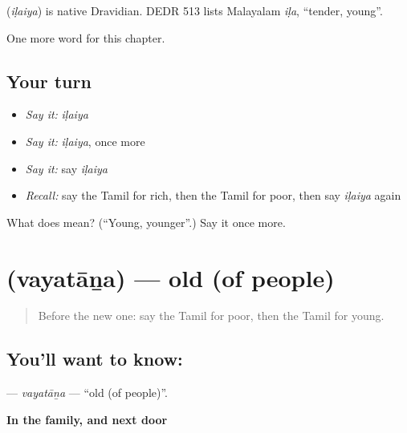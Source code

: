 \begin{cousinweb}
\textbf{} (\emph{iḷaiya}) is native Dravidian. DEDR 513 lists Malayalam \emph{iḷa}, \textquotedblleft{}tender, young\textquotedblright{}.
\end{cousinweb}

\begin{grammarlens}[title={What you've built}]
One more word for this chapter.
\end{grammarlens}

\subsection*{Your turn}
\begin{itemize}
\raggedright
  \item \emph{Say it:} \emph{iḷaiya}
  \item \emph{Say it:} \emph{iḷaiya}, once more
  \item \emph{Say it:} say \emph{iḷaiya}
  \item \emph{Recall:} say the Tamil for rich, then the Tamil for poor, then say \emph{iḷaiya} again
\end{itemize}

\begin{tcolorbox}[breakable,colback=teal!4,colframe=teal!35!black,title={Before you move on}]
What does  mean? (\textquotedblleft{}Young, younger\textquotedblright{}.) Say it once more.
\end{tcolorbox}
\section[\texorpdfstring{\ta{வயதான} (vayatāṉa)}{வயதான (vayatāṉa)}]{ (vayatāṉa) — old (of people)}

\label{lesson:TA-C147-vayatana}



\begin{quote}
Before the new one: say the Tamil for poor, then the Tamil for young.
\end{quote}

\subsection*{You'll want to know: }
\textbf{} — \emph{vayatāṉa} — \textquotedblleft{}old (of people)\textquotedblright{}.

\textbf{In the family, and next door}

